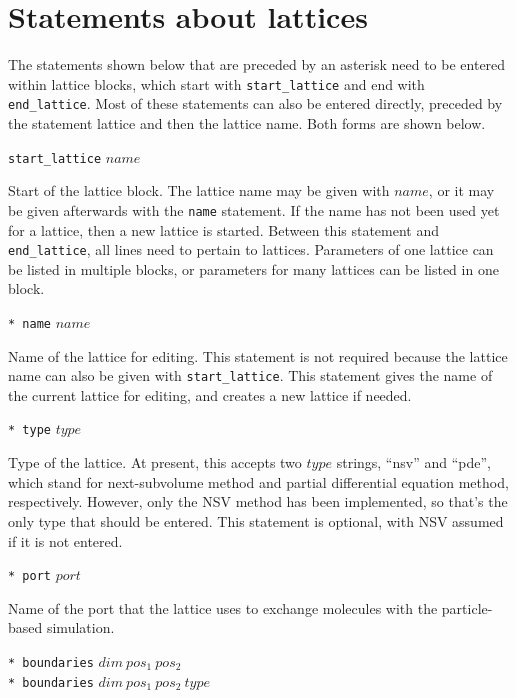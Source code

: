 \documentclass {scrbook}
\newcommand {\ttt} {\texttt}
\begin{document}
\section{Statements about lattices}

The statements shown below that are preceded by an asterisk need to be entered within lattice blocks, which start with \ttt{start\_lattice} and end with \ttt{end\_lattice}. Most of these statements can also be entered directly, preceded by the statement lattice and then the lattice name. Both forms are shown below.

\begin{description}

\item{\ttt{start\_lattice} $name$}

Start of the lattice block. The lattice name may be given with $name$, or it may be given afterwards with the \ttt{name} statement. If the name has not been used yet for a lattice, then a new lattice is started. Between this statement and \ttt{end\_lattice}, all lines need to pertain to lattices. Parameters of one lattice can be listed in multiple blocks, or parameters for many lattices can be listed in one block.

\item{\ttt{* name} $name$}

Name of the lattice for editing. This statement is not required because the lattice name can also be given with \ttt{start\_lattice}. This statement gives the name of the current lattice for editing, and creates a new lattice if needed.

\item{\ttt{* type} $type$}

Type of the lattice. At present, this accepts two $type$ strings, ``nsv'' and ``pde'', which stand for next-subvolume method and partial differential equation method, respectively. However, only the NSV method has been implemented, so that's the only type that should be entered. This statement is optional, with NSV assumed if it is not entered.

\item{\ttt{* port} $port$}

Name of the port that the lattice uses to exchange molecules with the particle-based simulation.

\item{\ttt{* boundaries} $dim\ pos_1\ pos_2$\\
\ttt{* boundaries} $dim\ pos_1\ pos_2\ type$}


\end{description}
\end{document}

